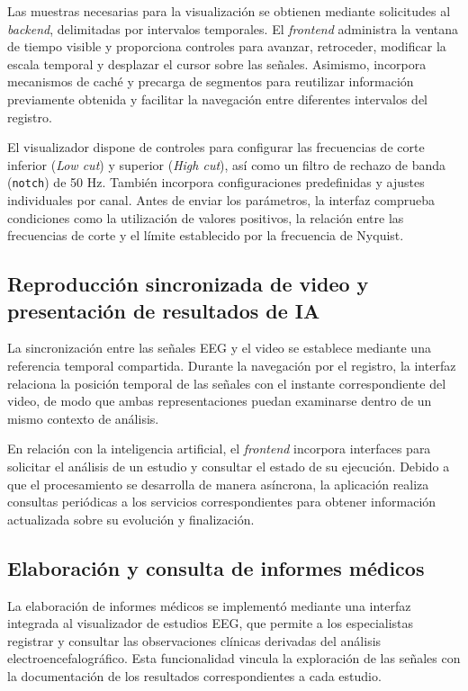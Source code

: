 Las muestras necesarias para la visualización
se obtienen mediante solicitudes al \textit{backend},
delimitadas por intervalos temporales.
El \textit{frontend} administra la ventana de tiempo
visible y proporciona controles para avanzar,
retroceder, modificar la escala temporal
y desplazar el cursor sobre las señales.
Asimismo, incorpora mecanismos de caché
y precarga de segmentos para reutilizar
información previamente obtenida y facilitar
la navegación entre diferentes intervalos
del registro.

El visualizador dispone de controles para configurar las frecuencias de corte inferior (\textit{Low cut}) y superior (\textit{High cut}), así como un filtro de rechazo de banda (\texttt{notch}) de 50 Hz. También incorpora configuraciones
predefinidas y ajustes individuales por
canal. Antes de enviar los parámetros,
la interfaz comprueba condiciones como
la utilización de valores positivos,
la relación entre las frecuencias de
corte y el límite establecido por la
frecuencia de Nyquist.

\subsection{Reproducción sincronizada de video y presentación de resultados de IA}

La sincronización entre las señales
EEG y el video se establece mediante
una referencia temporal compartida.
Durante la navegación por el registro,
la interfaz relaciona la posición
temporal de las señales con el instante
correspondiente del video, de modo
que ambas representaciones puedan
examinarse dentro de un mismo contexto
de análisis.

En relación con la inteligencia
artificial, el \textit{frontend} incorpora
interfaces para solicitar el análisis
de un estudio y consultar el estado
de su ejecución. Debido a que el
procesamiento se desarrolla de manera
asíncrona, la aplicación realiza
consultas periódicas a los servicios
correspondientes para obtener
información actualizada sobre
su evolución y finalización.

\subsection{Elaboración y consulta de informes médicos}

La elaboración de informes médicos se implementó
mediante una interfaz integrada al visualizador
de estudios EEG, que permite a los especialistas
registrar y consultar las observaciones clínicas
derivadas del análisis electroencefalográfico.
Esta funcionalidad vincula la exploración de las
señales con la documentación de los resultados
correspondientes a cada estudio.

